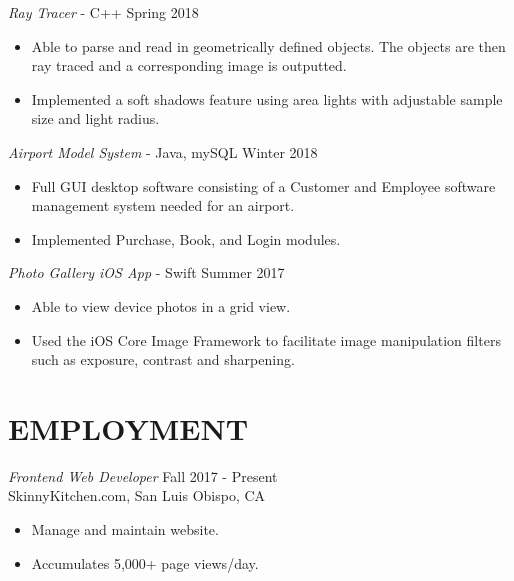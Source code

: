 \documentclass[margin]{res}
\begin{document}
\begin{resume}
                {\sl Ray Tracer} - C++ \hfill            Spring 2018
                 \begin{itemize}  \itemsep -2pt %
                 \item Able to parse and read in geometrically defined objects. The objects are then ray traced and a corresponding image is outputted.
                 \item Implemented a soft shadows feature using area lights with adjustable sample size and light radius.
                 \end{itemize}

                {\sl Airport Model System} - Java, mySQL \hfill        Winter 2018
                  \begin{itemize}
                   \item Full GUI desktop software consisting of a Customer and Employee software management system needed for an airport.
                   \item Implemented Purchase, Book, and Login modules.
                   \end{itemize}

                {\sl Photo Gallery iOS App} - Swift \hfill            Summer 2017
                 \begin{itemize}  \itemsep -2pt %
                 \item Able to view device photos in a grid view.
                 \item Used the iOS Core Image Framework to facilitate image manipulation filters such as exposure, contrast and sharpening.
                 \end{itemize}




\section{EMPLOYMENT} {\sl Frontend Web Developer} \hfill Fall 2017 - Present \\
                SkinnyKitchen.com, San Luis Obispo, CA
                 \begin{itemize}  \itemsep -2pt %
                 \item Manage and maintain website.
                \item Accumulates 5,000+ page views/day.
                \end{itemize}


\end{resume}
\end{document}
